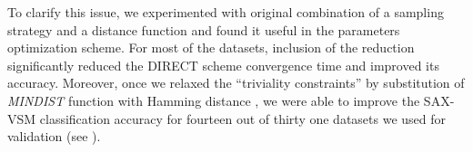 \documentclass{llncs}
\begin{document}
To clarify this issue, we experimented with original combination of a sampling strategy 
and a distance function and found it useful in the parameters optimization scheme. 
For most of the datasets, inclusion of the reduction significantly reduced the DIRECT 
scheme convergence time and improved its accuracy. 
Moreover, once we relaxed the ``triviality constraints'' by substitution of 
\textit{MINDIST} function \cite{streaming_sax} with Hamming distance \cite{hamming}, 
we were able to improve the SAX-VSM classification accuracy for fourteen 
out of thirty one datasets we used for validation (see \cite{jmotif}).
%
%
%
%
\end{document}
